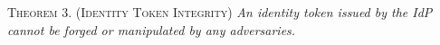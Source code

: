 
\newc
\vspace{1mm}
\noindent\textsc{Theorem 3. (Identity Token Integrity)} {\em An identity token issued by the IdP cannot be forged or manipulated by any adversaries.}



